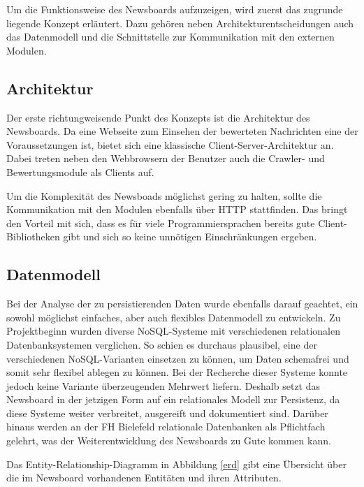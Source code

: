 Um die Funktionsweise des Newsboards aufzuzeigen, wird zuerst das zugrunde liegende Konzept erläutert.
Dazu gehören neben Architekturentscheidungen auch das Datenmodell und die Schnittstelle
zur Kommunikation mit den externen Modulen.

\subsection{Architektur}
Der erste richtungweisende Punkt des Konzepts ist die Architektur des Newsboards.
Da eine Webseite zum Einsehen der bewerteten Nachrichten eine der Voraussetzungen ist,
bietet sich eine klassische Client-Server-Architektur an.
Dabei treten neben den Webbrowsern der Benutzer auch die Crawler-
und Bewertungsmodule als Clients auf.

Um die Komplexität des Newsboads möglichst gering zu halten, sollte die Kommunikation
mit den Modulen ebenfalls über HTTP stattfinden. Das bringt den Vorteil mit sich,
dass es für viele Programmiersprachen bereits gute Client-Bibliotheken gibt
und sich so keine unnötigen Einschränkungen ergeben.

\subsection{Datenmodell}
Bei der Analyse der zu persistierenden Daten wurde ebenfalls darauf geachtet, ein
sowohl möglichst einfaches, aber auch flexibles Datenmodell zu entwickeln. Zu Projektbeginn wurden diverse NoSQL-Systeme mit verschiedenen relationalen Datenbanksystemen verglichen.
So schien es durchaus plausibel, eine der verschiedenen
NoSQL-Varianten einsetzen zu können, um Daten schemafrei und somit sehr flexibel 
ablegen zu können. Bei der Recherche dieser Systeme konnte jedoch keine Variante
überzeugenden Mehrwert liefern. Deshalb setzt das Newsboard in der jetzigen Form 
auf ein relationales Modell zur Persistenz, da diese Systeme weiter
verbreitet, ausgereift und dokumentiert sind.
Darüber hinaus werden an der FH Bielefeld relationale Datenbanken als Pflichtfach gelehrt,
was der Weiterentwicklung des Newsboards zu Gute kommen kann.

Das Entity-Relationship-Diagramm in Abbildung \ref{erd} gibt eine Übersicht über die im Newsboard
vorhandenen Entitäten und ihren Attributen.

